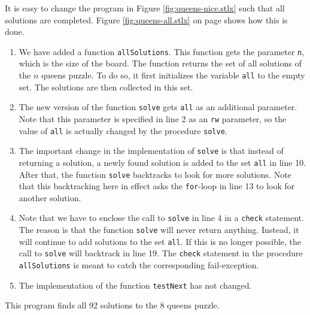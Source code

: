 It is easy to change the program in Figure \ref{fig:queens-nice.stlx} such that all
solutions are completed.   Figure \ref{fig:queens-all.stlx} on page
\pageref{fig:queens-all.stlx} shows how this is done.
\begin{enumerate}
\item We have added a function \texttt{allSolutions}.  This function gets the parameter
      \texttt{n}, which is the size of the board.
      The function returns the set of all solutions of the $n$ queens puzzle.
      To do so, it first initializes the variable \texttt{all} to the empty set.
      The solutions are then collected in this set.
\item The new version of the function \texttt{solve} gets \texttt{all} as an additional parameter.
      Note that this parameter is specified in line 2 as an \texttt{rw} parameter, so 
      the value of \texttt{all} is actually changed by the procedure \texttt{solve}.
\item The important change in the implementation of \texttt{solve} is that instead of
      returning a solution,  a newly found solution is added to the set \texttt{all} in
      line 10. After that, the function \texttt{solve} backtracks to look for more
      solutions.   Note that this backtracking here in effect asks the \texttt{for}-loop in line 13 
      to look for another solution.
\item Note that we have to enclose the call to \texttt{solve} in line 4 in a \texttt{check}
      statement.  The reason is that the function \texttt{solve} will never return anything.
      Instead, it will continue to add solutions to the set \texttt{all}.   If this is no longer
      possible, the call to \texttt{solve} will backtrack in line 19.  The \texttt{check} statement 
      in the procedure \texttt{allSolutions} is meant to catch the corresponding fail-exception.

      

\item The implementation of the function \texttt{testNext} has not changed.
\end{enumerate}
This program finds all 92 solutions to the $8$ queens puzzle.

